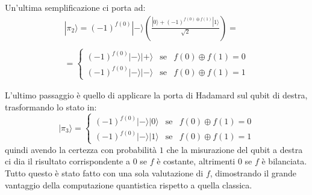 Un'ultima semplificazione ci porta ad:
\begin{equation*}
    \begin{array}{c}
        |\pi_2\rangle = (-1)^{f(0)}|-\rangle\left(\frac{|0\rangle + (-1)^{f(0)\oplus f(1)} |1\rangle}{\sqrt{2}}\right) = \\ \\
        = \left\{ \begin{array}{rcl}
            (-1)^{f(0)}|-\rangle|+\rangle & \text{se} & f(0) \oplus f(1) = 0 \\
            (-1)^{f(0)}|-\rangle|-\rangle & \text{se} & f(0) \oplus f(1) = 1
        \end{array}\right.
    \end{array}
\end{equation*}

L'ultimo passaggio è quello di applicare la porta di Hadamard sul qubit di destra, trasformando lo stato in:
\begin{equation*}
    |\pi_3\rangle = \left\{ \begin{array}{rcl}
        (-1)^{f(0)}|-\rangle|0\rangle & \text{se} & f(0) \oplus f(1) = 0 \\
        (-1)^{f(0)}|-\rangle|1\rangle & \text{se} & f(0) \oplus f(1) = 1
    \end{array}\right.
\end{equation*}
quindi avendo la certezza con probabilità $1$ che la misurazione del qubit a destra ci dia il risultato
corrispondente a $0$ se $f$ è costante, altrimenti $0$ se $f$ è bilanciata. Tutto questo è stato
fatto con una sola valutazione di $f$, dimostrando il grande vantaggio della computazione quantistica
rispetto a quella classica.